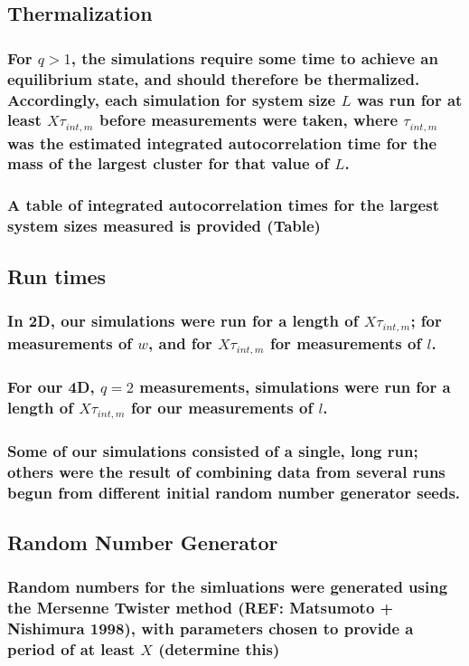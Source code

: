 \documentclass[pre,preprint]{revtex4-1}
\begin{document}
\subsection{Thermalization}
\label{sec-3.3}
\subsubsection{For $q>1$, the simulations require some time to achieve an equilibrium state, and should therefore be thermalized. Accordingly, each simulation for system size $L$ was run for at least $X \tau_{int,m}$ before measurements were taken, where $\tau_{int,m}$ was the estimated integrated autocorrelation time for the mass of the largest cluster for that value of $L$.}
\label{sec-3.3.1}
\subsubsection{A table of integrated autocorrelation times for the largest system sizes measured is provided (Table)}
\label{sec-3.3.2}
\subsection{Run times}
\label{sec-3.4}
\subsubsection{In 2D, our simulations were run for a length of $X \tau_{int,m}$; for measurements of $w$, and for $X  \tau_{int,m}$ for measurements of $l$.}
\label{sec-3.4.1}
\subsubsection{For our 4D, $q=2$ measurements, simulations were run for a length of $X \tau_{int,m}$ for our measurements of $l$.}
\label{sec-3.4.2}
\subsubsection{Some of our simulations consisted of a single, long run; others were the result of combining data from several runs begun from different initial random number generator seeds.}
\label{sec-3.4.3}
\subsection{Random Number Generator}
\label{sec-3.5}
\subsubsection{Random numbers for the simluations were generated using the Mersenne Twister method (REF:  Matsumoto + Nishimura 1998), with parameters chosen to provide a period of at least $X$ (determine this)}
\label{sec-3.5.1}
\end{document}
